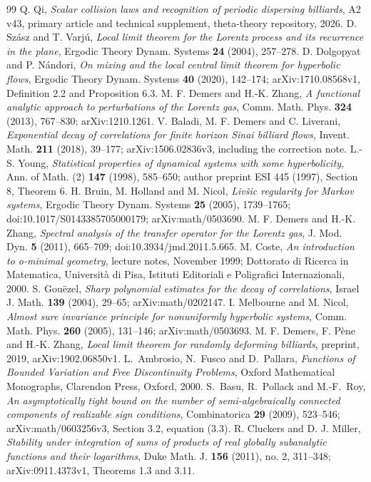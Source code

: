 \begin{thebibliography}{99}
 Q. Qi, \emph{Scalar collision laws and recognition of periodic dispersing billiards}, A2 v43, primary article and technical supplement, theta-theory repository, 2026.
 D. Sz\'asz and T. Varj\'u, \emph{Local limit theorem for the Lorentz process and its recurrence in the plane}, Ergodic Theory Dynam. Systems \textbf{24} (2004), 257--278.
 D. Dolgopyat and P. N\'andori, \emph{On mixing and the local central limit theorem for hyperbolic flows}, Ergodic Theory Dynam. Systems \textbf{40} (2020), 142--174; arXiv:1710.08568v1, Definition 2.2 and Proposition 6.3.
 M. F. Demers and H.-K. Zhang, \emph{A functional analytic approach to perturbations of the Lorentz gas}, Comm. Math. Phys. \textbf{324} (2013), 767--830; arXiv:1210.1261.
 V. Baladi, M. F. Demers and C. Liverani, \emph{Exponential decay of correlations for finite horizon Sinai billiard flows}, Invent. Math. \textbf{211} (2018), 39--177; arXiv:1506.02836v3, including the correction note.
 L.-S. Young, \emph{Statistical properties of dynamical systems with some hyperbolicity}, Ann. of Math. (2) \textbf{147} (1998), 585--650; author preprint ESI 445 (1997), Section 8, Theorem 6.
 H. Bruin, M. Holland and M. Nicol, \emph{Liv\v{s}ic regularity for Markov systems}, Ergodic Theory Dynam. Systems \textbf{25} (2005), 1739--1765; doi:10.1017/S0143385705000179; arXiv:math/0503690.
 M. F. Demers and H.-K. Zhang, \emph{Spectral analysis of the transfer operator for the Lorentz gas}, J. Mod. Dyn. \textbf{5} (2011), 665--709; doi:10.3934/jmd.2011.5.665.
 M. Coste, \emph{An introduction to o-minimal geometry}, lecture notes, November 1999; Dottorato di Ricerca in Matematica, Universit\`a di Pisa, Istituti Editoriali e Poligrafici Internazionali, 2000.
 S. Gou\"ezel, \emph{Sharp polynomial estimates for the decay of correlations}, Israel J. Math. \textbf{139} (2004), 29--65; arXiv:math/0202147.
 I. Melbourne and M. Nicol, \emph{Almost sure invariance principle for nonuniformly hyperbolic systems}, Comm. Math. Phys. \textbf{260} (2005), 131--146; arXiv:math/0503693.
 M. F. Demers, F. P\`ene and H.-K. Zhang, \emph{Local limit theorem for randomly deforming billiards}, preprint, 2019, arXiv:1902.06850v1.
L.~Ambrosio, N.~Fusco and D.~Pallara,
\emph{Functions of Bounded Variation and Free Discontinuity Problems},
Oxford Mathematical Monographs, Clarendon Press, Oxford, 2000.
S.~Basu, R.~Pollack and M.-F.~Roy,
\emph{An asymptotically tight bound on the number of semi-algebraically
connected components of realizable sign conditions},
Combinatorica \textbf{29} (2009), 523--546;
arXiv:math/0603256v3, Section 3.2, equation (3.3).
 R. Cluckers and D. J. Miller,
\emph{Stability under integration of sums of products of real globally
subanalytic functions and their logarithms}, Duke Math. J. \textbf{156}
(2011), no. 2, 311--348; arXiv:0911.4373v1, Theorems 1.3 and 3.11.


\end{thebibliography}
